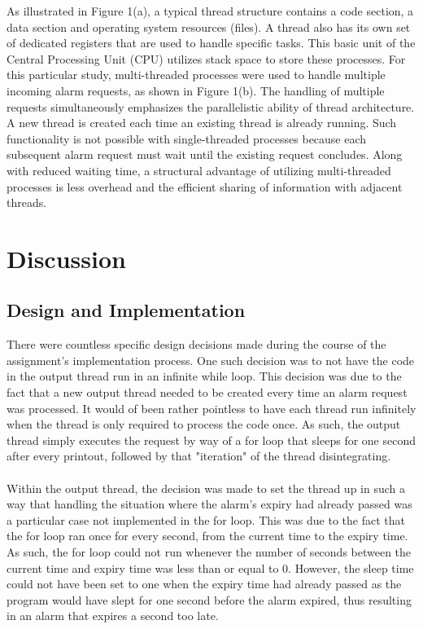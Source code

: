 \documentclass[11pt]{article}
\newcommand{\forceindent}{\leavevmode{\parindent=1em\indent}}
\begin{document}
 As illustrated in Figure 1(a), a typical thread structure contains a code section, a data section and operating system resources (files). A thread also has its own set of dedicated registers that are used to handle specific tasks. This basic unit of the Central Processing Unit (CPU) utilizes stack space to store these processes. For this particular study, multi-threaded processes were used to handle multiple incoming alarm requests, as shown in Figure 1(b). The handling of multiple requests simultaneously emphasizes the parallelistic ability of thread architecture. A new thread is created each time an existing thread is already running. Such functionality is not possible with single-threaded processes because each subsequent alarm request must wait until the existing request concludes. Along with reduced waiting time, a structural advantage of utilizing multi-threaded processes is less overhead and the efficient sharing of information with adjacent threads.                
                
\section{Discussion}
	\subsection{Design and Implementation}
	
\forceindent There were countless specific design decisions made during the course of the assignment's implementation process. One such decision was to not have the code in the output thread run in an infinite while loop. This decision was due to the fact that a new output thread needed to be created every time an alarm request was processed. It would of been rather pointless to have each thread run infinitely when the thread is only required to process the code once. As such, the output thread simply executes the request by way of a for loop that sleeps for one second after every printout, followed by that "iteration" of the thread disintegrating. \\
\\
\forceindent Within the output thread, the decision was made to set the thread up in such a way that handling the situation where the alarm's expiry had already passed was a particular case not implemented in the for loop. This was due to the fact that the for loop ran once for every second, from the current time to the expiry time. As such, the for loop could not run whenever the number of seconds between the current time and expiry time was less than or equal to 0. However, the sleep time could not have been set to one when the expiry time had already passed as  the program would have slept for one second before the alarm expired, thus resulting in an alarm that expires a second too late.
\end{document}
